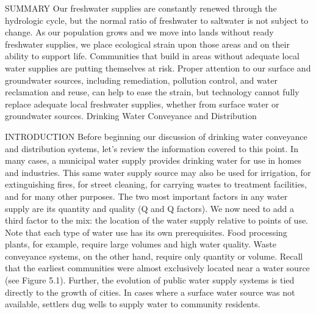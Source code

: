 \documentclass{article}
\begin{document}
SUMMARY Our freshwater supplies are constantly renewed through the
hydrologic cycle, but the normal ratio of freshwater to saltwater is not
subject to change. As our population grows and we move into lands
without ready freshwater supplies, we place ecological strain upon those
areas and on their ability to support life. Communities that build in
areas without adequate local water supplies are putting themselves at
risk. Proper attention to our surface and groundwater sources, including
remediation, pollution control, and water reclamation and reuse, can
help to ease the strain, but technology cannot fully replace adequate
local freshwater supplies, whether from surface water or groundwater
sources. Drinking Water Conveyance and Distribution

INTRODUCTION Before beginning our discussion of drinking water
conveyance and distribution systems, let's review the information
covered to this point. In many cases, a municipal water supply provides
drinking water for use in homes and industries. This same water supply
source may also be used for irrigation, for extinguishing fires, for
street cleaning, for carrying wastes to treatment facilities, and for
many other purposes. The two most important factors in any water supply
are its quantity and quality (Q and Q factors). We now need to add a
third factor to the mix: the location of the water supply relative to
points of use. Note that each type of water use has its own
prerequisites. Food processing plants, for example, require large
volumes and high water quality. Waste conveyance systems, on the other
hand, require only quantity or volume. Recall that the earliest
communities were almost exclusively located near a water source (see
Figure 5.1). Further, the evolution of public water supply systems is
tied directly to the growth of cities. In cases where a surface water
source was not available, settlers dug wells to supply water to
community residents.
\end{document}
